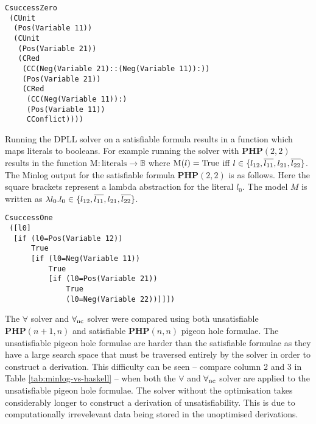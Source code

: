 \begin{lstlisting}[caption = "The derivation produce by X-SAT for PHP(2\,1)"]
CsuccessZero
 (CUnit
  (Pos(Variable 11))
  (CUnit
   (Pos(Variable 21))
   (CRed
    (CC(Neg(Variable 21)::(Neg(Variable 11)):))
    (Pos(Variable 21))
    (CRed
     (CC(Neg(Variable 11)):)
     (Pos(Variable 11))
     CConflict))))
\end{lstlisting}

Running the DPLL solver on a satisfiable formula results in a function which 
maps literals to booleans. For example running the solver with 
$\mathbf{PHP}(2,2)$ results in the function  
	 $\mathrm{M}: \mathrm{literals} \to \mathbb{B}$  where  
$\mathrm{M}(l) = \mathrm{True}$ iff  $l \in \{ l_{12}, \overline{ l_{11}}, l_{21}, \overline{ l_{22}}  \}$.
The Minlog output for the satisfiable formula $\mathbf{PHP}(2,2)$ is as follows. Here the square brackets represent a lambda abstraction for the literal $l_0$. The model $M$ is written as $\lambda l_0 . l_0 \in \{ l_{12}, \overline{l_{11}},l_{21}, \overline{l_{22}} \}$.
\begin{lstlisting}[caption = "The model produced by X-SAT for PHP(2\,2)"]
CsuccessOne
 ([l0]
  [if (l0=Pos(Variable 12))
      True 
      [if (l0=Neg(Variable 11)) 
          True 
          [if (l0=Pos(Variable 21)) 
              True 
              (l0=Neg(Variable 22))]]])
\end{lstlisting}
%
%
The $\forall$ solver and $\forall_{\mathrm{nc}}$ solver were compared using both unsatisfiable  $\mathbf{PHP}(n+1, n)$ and satisfiable $\mathbf{PHP}(n,n)$ pigeon hole formulae. The unsatisfiable pigeon hole formulae are harder than the satisfiable formulae as they have a large search space that must be traversed entirely by the solver in order to construct a derivation.
%
This difficulty can be seen -- compare column 2 and 3 in Table 
\ref{tab:minlog-vs-haskell} %
-- when both the $\forall$ and $\forall_{\mathrm{nc}}$ solver are applied to the unsatisfiable pigeon hole formulae. The solver without the optimisation takes considerably longer to construct a derivation of unsatisfiability. This is due to computationally irrevelevant data being stored in the unoptimised derivations. \medskip \\ 
